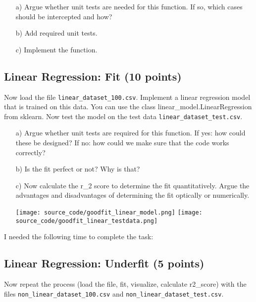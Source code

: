 \begin{enumerate}

\item[a)] Argue whether unit tests are needed for this function. If so, which cases should be intercepted and how?

\item[b)] Add required unit tests.

\item[c)] Implement the function.

\end{enumerate}

\subsection{Linear Regression: Fit (10 points)}

Now load the file \texttt{linear\_dataset\_100.csv}. Implement a linear regression model that is trained on this data. You can use the class linear\_model.LinearRegression from sklearn. Now test the model on the test data \texttt{linear\_dataset\_test.csv}.

\begin{enumerate}

\item[a)] Argue whether unit tests are required for this function. If yes: how could these be designed? If no: how could we make sure that the code works correctly?

\item[b)] Is the fit perfect or not? Why is that? 

\item[c)] Now calculate the r\_2 score to determine the fit quantitatively. Argue the advantages and disadvantages of determining the fit optically or numerically.

\texttt{[image: source\_code/goodfit\_linear\_model.png]}
\texttt{[image: source\_code/goodfit\_linear\_testdata.png]}

\end{enumerate}

I needed the following time to complete the task:

\subsection{Linear Regression: Underfit (5 points)}

Now repeat the process (load the file, fit, visualize, calculate r2\_score) with the files \texttt{non\_linear\_dataset\_100.csv} and \texttt{non\_linear\_dataset\_test.csv}.

